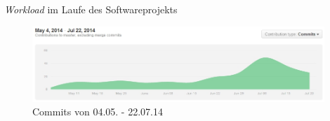 \documentclass[11pt,a4paper]{beamer}
\begin{document}
\begin{frame}

    \begin{gantt}{10}{9}
    \begin{ganttitle}
    \end{ganttitle}
    \begin{ganttitle}
    \end{ganttitle}
  \end{gantt}
  
\end{frame}

\begin{frame}{\textit{Workload} im Laufe des Softwareprojekts}
\begin{figure}
\begin{center}
\includegraphics[width=11cm]{contributions_to_master.jpg}
\caption{Commits von 04.05. - 22.07.14}
\label{fig:contributions}
\end{center}
\end{figure}
\end{frame}
\end{document}
